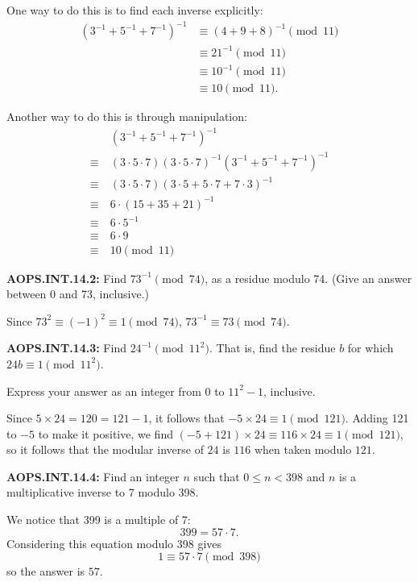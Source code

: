 \documentclass[11pt]{article}
\newenvironment{uzdevums}[1][\unskip]{%
\vspace{3mm}
\noindent
\textbf{#1:}
\noindent}
{}
\begin{document}
One way to do this is to find each inverse explicitly: \begin{align*}
(3^{-1}+5^{-1}+7^{-1})^{-1} &\equiv (4+9+8)^{-1} \pmod{11} \\
&\equiv 21^{-1} \pmod{11} \\
&\equiv 10^{-1} \pmod{11} \\
&\equiv \boxed{10}\pmod{11}.
\end{align*}

Another way to do this is through manipulation: \begin{align*}
& (3^{-1}+5^{-1}+7^{-1})^{-1}\\
\equiv~ & (3\cdot 5\cdot 7)(3\cdot 5\cdot 7)^{-1}(3^{-1}+5^{-1}+7^{-1})^{-1}\\
\equiv~ & (3\cdot 5\cdot 7)(3\cdot 5+5\cdot 7+ 7\cdot 3)^{-1}\\
\equiv~ & 6\cdot(15+35+21)^{-1}\\
\equiv~ & 6\cdot 5^{-1}\\
\equiv~ & 6\cdot 9\\
\equiv~ & \boxed{10} \pmod{11}
\end{align*}

\begin{uzdevums}[AOPS.INT.14.2]
Find $73^{-1} \pmod{74}$, as a residue modulo 74. (Give an answer between 0 and 73, inclusive.)
\end{uzdevums}


Since $73^2 \equiv (-1)^2 \equiv 1 \pmod{74}$, $73^{-1} \equiv \boxed{73} \pmod{74}$.


\begin{uzdevums}[AOPS.INT.14.3]
Find $24^{-1} \pmod{11^2}$. That is, find the residue $b$ for which $24b \equiv 1\pmod{11^2}$.

Express your answer as an integer from $0$ to $11^2-1$, inclusive.
\end{uzdevums}

Since $5 \times 24 = 120 = 121 - 1$, it follows that $-5 \times 24 \equiv 1 \pmod{121}$. Adding 121 to $-5$ to make it positive, we find $(-5 + 121) \times 24 \equiv 116 \times 24 \equiv 1 \pmod{121}$, so it follows that the modular inverse of $24$ is $\boxed{116}$ when taken modulo $121$.

\begin{uzdevums}[AOPS.INT.14.4]
Find an integer $n$ such that $0\leq n<398$ and $n$ is a multiplicative inverse to 7 modulo 398.
\end{uzdevums}


We notice that 399 is a multiple of 7: \[399=57\cdot7.\]Considering this equation modulo 398 gives \[1\equiv57\cdot7\pmod{398}\]so the answer is $\boxed{57}$.
\end{document}
